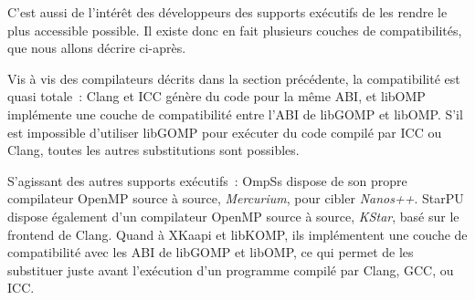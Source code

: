 C'est aussi de l'intérêt des développeurs des supports exécutifs de les rendre le plus accessible possible.
Il existe donc en fait plusieurs couches de compatibilités, que nous allons décrire ci-après.

Vis à vis des compilateurs décrits dans la section précédente, la compatibilité est quasi totale~: Clang et ICC génère du code pour la même ABI, et libOMP implémente une couche de compatibilité entre l'ABI de libGOMP et libOMP.
S'il est impossible d'utiliser libGOMP pour exécuter du code compilé par ICC ou Clang, toutes les autres substitutions sont possibles.

S'agissant des autres supports exécutifs~: OmpSs dispose de son propre compilateur OpenMP source à source, \emph{Mercurium}, pour cibler \emph{Nanos++}. StarPU dispose également d'un compilateur OpenMP source à source, \emph{KStar}, basé sur le frontend de Clang.
Quand à XKaapi et libKOMP, ils implémentent une couche de compatibilité avec les ABI de libGOMP et libOMP, ce qui permet de les substituer juste avant l'exécution d'un programme compilé par Clang, GCC, ou ICC.

